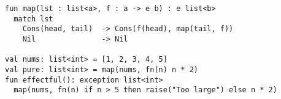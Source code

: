 \begin{algorithm}

\begin{verbatim}
fun map(lst : list<a>, f : a -> e b) : e list<b>
  match lst
    Cons(head, tail)  -> Cons(f(head), map(tail, f))
    Nil               -> Nil

val nums: list<int> = [1, 2, 3, 4, 5]
val pure: list<int> = map(nums, fn(n) n * 2)
fun effectful(): exception list<int>
  map(nums, fn(n) if n > 5 then raise("Too large") else n * 2)
\end{verbatim}

\caption{Effect polymorphism in Koka. %
\label{alg-eff:polymorphism-koka}}
\end{algorithm}